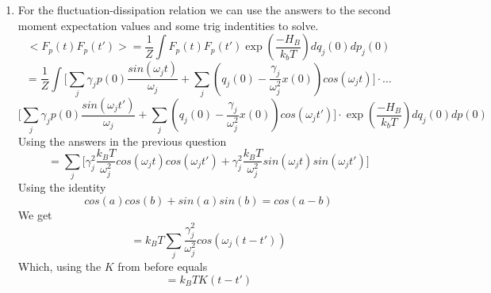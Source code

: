 \documentclass[10pt,a4paper,oneside]{article}
\begin{document}
\begin{enumerate}
    \item For the fluctuation-dissipation relation we can use the answers to the second moment expectation values and some trig indentities to solve. 
    $$ <F_p(t) F_p(t') > = \frac{1}{Z} \int F_p(t) F_p(t') \exp(\frac{-H_B}{k_b T}) dq_j (0) dp_j(0) $$
    $$ = \frac{1}{Z} \int \Big[ \sum_j \gamma_j p(0) \frac{sin(\omega_j t)}{\omega_j} + \sum_j (q_j(0) - \frac{\gamma_j}{\omega_j^2}x(0))cos(\omega_j t)\Big] \cdot \ldots $$
    $$ \Big[ \sum_j \gamma_j p(0) \frac{sin(\omega_j t')}{\omega_j} + \sum_j (q_j(0) - \frac{\gamma_j}{\omega_j^2}x(0))cos(\omega_j t')\Big] \cdot \exp(\frac{-H_B}{k_b T}) dq_j(0) dp(0) $$
    Using the answers in the previous question
    $$ = \sum_j \Big[ \gamma_j^2 \frac{k_B T}{\omega_j^2} cos(\omega_j t)cos(\omega_j t') + \gamma_j^2 \frac{k_B T}{\omega_j^2} sin(\omega_j t) sin(\omega_j t') \Big] $$
    Using the identity 
    $$ cos(a)cos(b) +sin(a)sin(b) = cos(a-b) $$
    We get 
    $$ = k_B T \sum_j \frac{\gamma_j^2}{\omega_j^2} cos(\omega_j ( t-t')) $$
    Which, using the $K$ from before equals
    $$ = k_B T K(t-t') $$
\end{enumerate}
\end{document}
